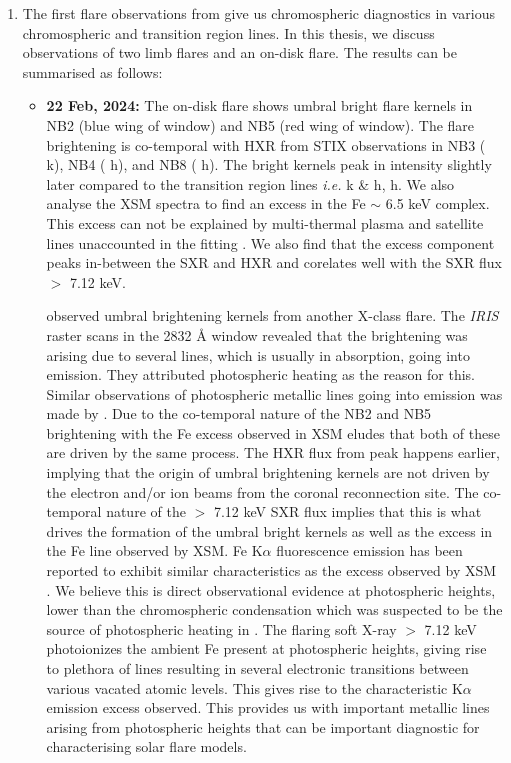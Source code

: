 \begin{enumerate}
    \item The first flare observations from {\suit} give us chromospheric diagnostics in various chromospheric and transition region lines. In this thesis, we discuss {\suit} observations of two limb flares and an on-disk flare. The results can be summarised as follows:
    \begin{itemize}[label=]
        \item {\bf 22 Feb, 2024:} The on-disk flare shows umbral bright flare kernels in NB2 (blue wing of  window) and NB5 (red wing of  window). The flare brightening is co-temporal with HXR from STIX observations in NB3 ( k), NB4 ( h), and NB8 ( h). The bright kernels peak in intensity slightly later compared to the transition region lines {\it i.e.}  k \& h,  h. We also analyse the XSM spectra to find an excess in the Fe $\sim$ 6.5 keV complex. This excess can not be explained by multi-thermal plasma and satellite lines unaccounted in the fitting \citep{mithun22}. We also find that the excess component peaks in-between the SXR and HXR and corelates well with the SXR flux $>$ 7.12 keV. 
        
        \cite{kowalski19} observed umbral brightening kernels from another X-class flare. The {\it IRIS} raster scans in the 2832 {\AA} window revealed that the brightening was arising due to several  lines, which is usually in absorption, going into emission. They attributed photospheric heating as the reason for this. Similar observations of photospheric metallic lines going into emission was made by \cite{heinzel14,kleint17}. Due to the co-temporal nature of the NB2 and NB5 brightening with the Fe excess observed in XSM eludes that both of these are driven by the same process. The HXR flux from peak happens earlier, implying that the origin of umbral brightening kernels are not driven by the electron and/or ion beams from the coronal reconnection site. The co-temporal nature of the $>$ 7.12 keV SXR flux implies that this is what drives the formation of the umbral bright kernels as well as the excess in the Fe line observed by XSM. Fe K$\alpha$ fluorescence emission has been reported to exhibit similar characteristics as the excess observed by XSM \citep{doscheck71,tanaka84,phillips12,parmar84}. We believe this is direct observational evidence at photospheric heights, lower than the chromospheric condensation which was suspected to be the source of photospheric heating in \citep{kowalski19}. The flaring soft X-ray $>$ 7.12 keV photoionizes the ambient Fe present at photospheric heights, giving rise to plethora of  lines resulting in several electronic transitions between various vacated atomic levels. This gives rise to the characteristic K$\alpha$ emission excess observed. This provides us with important metallic lines arising from photospheric heights that can be important diagnostic for characterising solar flare models.
        

\end{itemize}
\end{enumerate}
